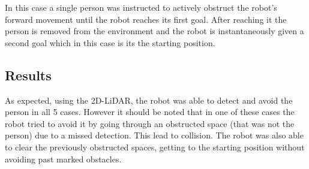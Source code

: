 In this case a single person was instructed to actively obstruct the robot's forward movement until the robot reaches its first goal. After reaching it the person is removed from the environment  and the robot is  instantaneously given a second goal which in this case is its the starting position. 

\subsection{Results}


As expected, using the 2D-\ac{LiDAR}, the robot was able to detect and avoid the person in all 5 cases. However it should be noted that in one of these cases the robot tried to avoid it by going through an obstructed space (that was not the person) due to a missed detection. This lead to collision. The robot was also able to clear the previously obstructed spaces, getting to the starting position without avoiding past marked obstacles.

